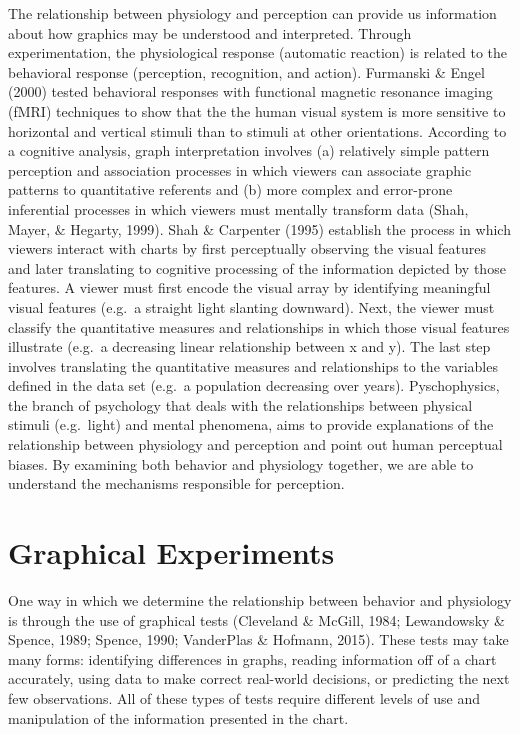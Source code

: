 \documentclass[print]{nuthesis}
\begin{document}
The relationship between physiology and perception can provide us information about how graphics may be understood and interpreted.
Through experimentation, the physiological response (automatic reaction) is related to the behavioral response (perception, recognition, and action).
Furmanski \& Engel (2000) tested behavioral responses with functional magnetic resonance imaging (fMRI) techniques to show that the the human visual system is more sensitive to horizontal and vertical stimuli than to stimuli at other orientations.
According to a cognitive analysis, graph interpretation involves (a) relatively simple pattern perception and association processes in which viewers can associate graphic patterns to quantitative referents and (b) more complex and error-prone inferential processes in which viewers must mentally transform data (Shah, Mayer, \& Hegarty, 1999).
Shah \& Carpenter (1995) establish the process in which viewers interact with charts by first perceptually observing the visual features and later translating to cognitive processing of the information depicted by those features.
A viewer must first encode the visual array by identifying meaningful visual features (e.g.~a straight light slanting downward).
Next, the viewer must classify the quantitative measures and relationships in which those visual features illustrate (e.g.~a decreasing linear relationship between x and y).
The last step involves translating the quantitative measures and relationships to the variables defined in the data set (e.g.~a population decreasing over years).
Pyschophysics, the branch of psychology that deals with the relationships between physical stimuli (e.g.~light) and mental phenomena, aims to provide explanations of the relationship between physiology and perception and point out human perceptual biases.
By examining both behavior and physiology together, we are able to understand the mechanisms responsible for perception.

\hypertarget{graphical-experiments}{%
\section{Graphical Experiments}\label{graphical-experiments}}

One way in which we determine the relationship between behavior and physiology is through the use of graphical tests (Cleveland \& McGill, 1984; Lewandowsky \& Spence, 1989; Spence, 1990; VanderPlas \& Hofmann, 2015).
These tests may take many forms: identifying differences in graphs, reading information off of a chart accurately, using data to make correct real-world decisions, or predicting the next few observations.
All of these types of tests require different levels of use and manipulation of the information presented in the chart.
\end{document}
